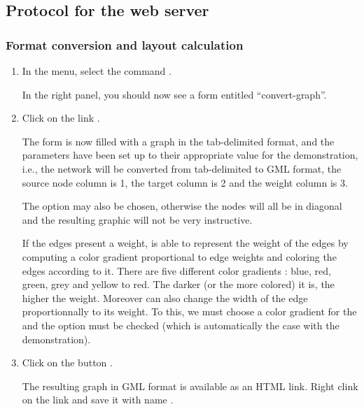 \subsection{Protocol for the web server}

\subsubsection{Format conversion and layout calculation}

\begin{enumerate}

\item In the \neat menu, select the command . 

  In the right panel, you should now see a form entitled
  ``convert-graph''.

\item Click on the link . 

  The form is now filled with a graph in the tab-delimited format, and the parameters have been
  set up to their appropriate value for the demonstration, i.e., the network will be converted 
  from tab-delimited to GML format, the source node column is 1, the target column is 2 and the weight column is 3.
  
  The option  may also be chosen, otherwise the nodes will all be in diagonal and the resulting graphic will not be very instructive.
  
  If the edges present a weight,  is able to represent the weight of the edges by computing a color gradient proportional to edge weights and coloring the edges according to it. There are five different color gradients : blue, red, green, grey and yellow to red. The darker (or the more colored) it is, the higher the weight. Moreover  can also change the width of the edge proportionnally to its weight. To this, we must choose a color gradient for the  and the option  must be checked (which is automatically the case with the demonstration). 
 
\item Click on the button . 

  The resulting graph in GML format is available as an HTML link. Right clink on the link and save it with name .
  
\end{enumerate}
